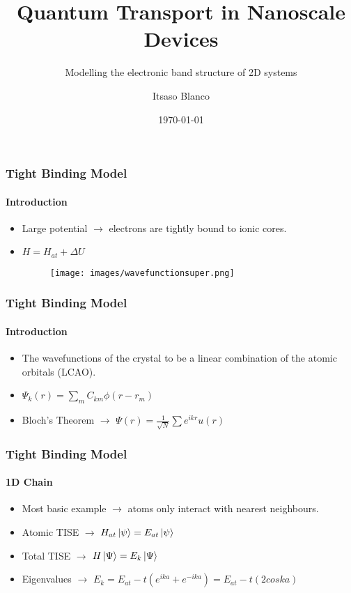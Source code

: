 \documentclass{beamer}
\title[Quantum Transport in Nanoscale Devices]{Quantum Transport in Nanoscale Devices}
\subtitle{Modelling the electronic band structure of 2D systems}
\author{Itsaso Blanco}
\date{\today}
\institute{Donostia International Physics Center}
\begin{document}
	
	\begin{frame}[plain]
		\maketitle
	\end{frame}
	
	\begin{frame}
		\frametitle{Tight Binding Model}
		\framesubtitle{Introduction}
		
		\begin{itemize}
			\item Large potential $\rightarrow$ electrons are tightly bound to ionic cores. 
			\item 	$H = H_{at} + \Delta U$ 
			\begin{figure}[h]
				\begin{center}
					\texttt{[image: images/wavefunctionsuper.png]}
				\end{center}
				\label{fig:1dchaindiagram}
			\end{figure}
		\end{itemize}
		
	\end{frame}

	\begin{frame}
		\frametitle{Tight Binding Model}
		\framesubtitle{Introduction}
		
		\begin{itemize}
			\item  The wavefunctions of the
			crystal to be a linear combination of the atomic orbitals (LCAO).
			\item $\Psi_k (r) = \sum_{m} C_{km} \phi ( r - r_m) $
			\item Bloch's Theorem $\rightarrow$ $\Psi (r) = \frac{1}{\sqrt{N}} \sum{e^{ikr} u(r)} $
		\end{itemize}
	\end{frame}

	\begin{frame}
		\frametitle{Tight Binding Model}
		\framesubtitle{1D Chain}
		\begin{itemize}
			\item Most basic example $\rightarrow$ atoms only interact with nearest neighbours.
			\item Atomic TISE $\rightarrow$ $ H_{at} \ket{\psi} = E_{at} \ket{\psi} $		
			\item Total TISE $\rightarrow$ 	$ H \ket{\Psi} = E_k \ket{\Psi} $
			\item Eigenvalues $\rightarrow$ $ E_k = E_{at} - t( e^{ika} + e^{-ika} ) = E_{at} - t(2coska) $
		\end{itemize}
	
	\end{frame}
\end{document}
